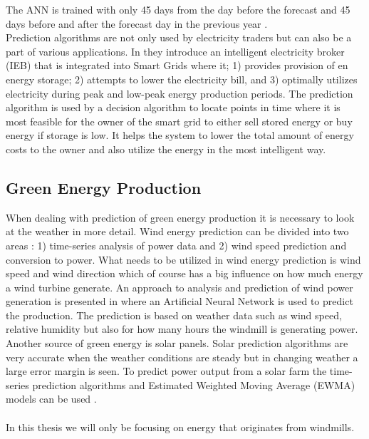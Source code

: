 \documentclass[twoside,11pt,openright]{report}
\begin{document}
The ANN is trained with only 45 days from the day before the forecast and 45 days before and after the forecast day in the previous year \cite{pjmForecast}.
\\[0.5cm]
Prediction algorithms are not only used by electricity traders but can also be a part of various applications. In \cite{22} they introduce an intelligent electricity broker (IEB) that is integrated into Smart Grids where it; 1) provides provision of en energy storage; 2) attempts to lower the electricity bill, and 3) optimally utilizes electricity during peak and low-peak energy production periods. The prediction algorithm is used by a decision algorithm to locate points in time where it is most feasible for the owner of the smart grid to either sell stored energy or buy energy if storage is low. It helps the system to lower the total amount of energy costs to the owner and also utilize the energy in the most intelligent way.
 
\subsection{Green Energy Production}
When dealing with prediction of green energy production it is necessary to look at the weather in more detail. Wind energy prediction can be divided into two areas \cite{5}: 1) time-series analysis of power data and 2) wind speed prediction and conversion to power. What needs to be utilized in wind energy prediction is wind speed and wind direction which of course has a big influence on how much energy a wind turbine generate. An approach to analysis and prediction of wind power generation is presented in \cite{WindPowerGenerationUsingANN} where an Artificial Neural Network is used to predict the production. The prediction is based on weather data such as wind speed, relative humidity but also for how many hours the windmill is generating power. 
\\[0.5cm]
Another source of green energy is solar panels. Solar
prediction algorithms are very accurate when the weather conditions are steady but in changing weather a large error margin is seen. To predict power output from a solar farm the time-series prediction algorithms and Estimated Weighted Moving Average (EWMA) models can be used \cite{5}.
\\[0.5cm]

\\[0.5cm]
In this thesis we will only be focusing on energy that originates from windmills. 
\end{document}
